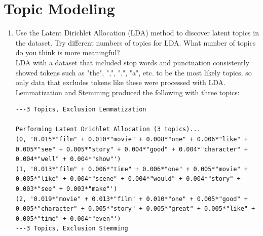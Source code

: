 \documentclass[conference]{IEEEtran}
\begin{document}
\section{Topic Modeling}
\begin{enumerate}
    \item Use the Latent Dirichlet Allocation (LDA) method to discover latent topics in the dataset. Try different numbers of topics for LDA. What number of topics do you think is more meaningful?\\
    LDA with a dataset that included stop words and punctuation consistently showed tokens such as "the", ",", ".", "a", etc. to be the most likely topics, so only data that excludes tokens like these were processed with LDA. Lemmatization and Stemming produced the following with three topics:
\begin{lstlisting}
---3 Topics, Exclusion Lemmatization

Performing Latent Drichlet Allocation (3 topics)...
(0, '0.015*"film" + 0.010*"movie" + 0.008*"one" + 0.006*"like" + 0.005*"see" + 0.005*"story" + 0.004*"good" + 0.004*"character" + 0.004*"well" + 0.004*"show"')
(1, '0.013*"film" + 0.006*"time" + 0.006*"one" + 0.005*"movie" + 0.005*"like" + 0.004*"scene" + 0.004*"would" + 0.004*"story" + 0.003*"see" + 0.003*"make"')
(2, '0.019*"movie" + 0.013*"film" + 0.010*"one" + 0.005*"good" + 0.005*"character" + 0.005*"story" + 0.005*"great" + 0.005*"like" + 0.005*"time" + 0.004*"even"')
---3 Topics, Exclusion Stemming


\end{lstlisting}
\end{enumerate}
\end{document}
